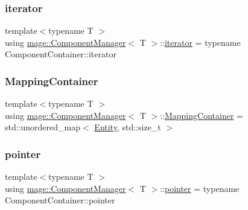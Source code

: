 \mbox{\label{classmage_1_1_component_manager_a28023a75938eb74870ba4b5952ddb61f}} 
\subsubsection{\texorpdfstring{iterator}{iterator}}
{\footnotesize\ttfamily template$<$typename T $>$ \\
using \mbox{\hyperlink{classmage_1_1_component_manager}{mage\+::\+Component\+Manager}}$<$ T $>$\+::\mbox{\hyperlink{classmage_1_1_component_manager_a28023a75938eb74870ba4b5952ddb61f}{iterator}} =  typename Component\+Container\+::iterator}

\mbox{\label{classmage_1_1_component_manager_a1d556c6a0d8ae9efcf0b63d31305352d}} 
\subsubsection{\texorpdfstring{Mapping\+Container}{MappingContainer}}
{\footnotesize\ttfamily template$<$typename T $>$ \\
using \mbox{\hyperlink{classmage_1_1_component_manager}{mage\+::\+Component\+Manager}}$<$ T $>$\+::\mbox{\hyperlink{classmage_1_1_component_manager_a1d556c6a0d8ae9efcf0b63d31305352d}{Mapping\+Container}} =  std\+::unordered\+\_\+map$<$ \mbox{\hyperlink{classmage_1_1_entity}{Entity}}, std\+::size\+\_\+t $>$}

\mbox{\label{classmage_1_1_component_manager_a8a96debf4c395e068990c85e8b66d564}} 
\subsubsection{\texorpdfstring{pointer}{pointer}}
{\footnotesize\ttfamily template$<$typename T $>$ \\
using \mbox{\hyperlink{classmage_1_1_component_manager}{mage\+::\+Component\+Manager}}$<$ T $>$\+::\mbox{\hyperlink{classmage_1_1_component_manager_a8a96debf4c395e068990c85e8b66d564}{pointer}} =  typename Component\+Container\+::pointer}

